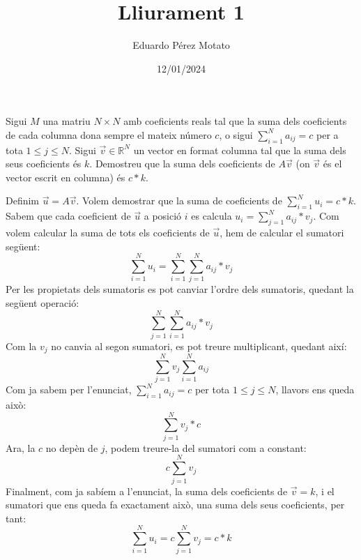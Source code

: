 \documentclass[a4paper, 12pt]{article}
\title{Lliurament 1}
\author{Eduardo Pérez Motato}
\date{12/01/2024}
\begin{document}
    \makeheader

    \begin{exercici}
        Sigui $M$ una matriu $N \times N$ amb coeficients reals tal que la suma dels coeficients de
        cada columna dona sempre el mateix número $c$, o sigui $\sum_{i=1}^{N} a_{ij}=c$ per a tota
        $1 \leq j \leq N$. Sigui $\vec{v} \in \mathbb{R}^N$ un vector en format columna tal que la
        suma dels seus coeficients és $k$. Demostreu que la suma dels coeficients de $A\vec{v}$ (on
        $\vec{v}$ és el vector escrit en columna) és $c * k$.
    \end{exercici}
    \begin{solucio}
        Definim $\vec{u} = A\vec{v}$. Volem demostrar que la suma de coeficients de $\sum_{i=1}^{N} u_i = c*k$.
        Sabem que cada coeficient de $\vec{u}$ a posició $i$ es calcula $u_i = \sum_{j=1}^{N} a_{ij}*v_j$.
        Com volem calcular la suma de tots els coeficients de $\vec{u}$, hem de calcular el sumatori
        següent:
        \begin{displaymath} 
            \sum_{i=1}^{N} u_i = \sum_{i=1}^{N} \sum_{j=1}^{N} a_{ij}*v_j  
        \end{displaymath}
        Per les propietats dels sumatoris es pot canviar l'ordre dels sumatoris, quedant la següent operació:
        \begin{displaymath}
            \sum_{j=1}^{N} \sum_{i=1}^{N} a_{ij}*v_j
        \end{displaymath}
        Com la $v_j$ no canvia al segon sumatori, es pot treure multiplicant, quedant així:
        \begin{displaymath}
            \sum_{j=1}^{N} v_j \sum_{i=1}^{N} a_{ij}
        \end{displaymath}
        Com ja sabem per l'enunciat, $\sum_{i=1}^{N} a_{ij}=c$ per tota $1 \leq j \leq N$, llavors ens queda això:
        \begin{displaymath}
            \sum_{j=1}^{N} v_j * c
        \end{displaymath}
        Ara, la $c$ no depèn de $j$, podem treure-la del sumatori com a constant:
        \begin{displaymath}
            c\sum_{j=1}^{N} v_j
        \end{displaymath}
        Finalment, com ja sabíem a l'enunciat, la suma dels coeficients de $\vec{v} = k$, i el sumatori
        que ens queda fa exactament això, una suma dels seus coeficients, per tant:
         \begin{displaymath}
            \sum_{i=1}^{N} u_i = c \sum_{j=1}^{N} v_j = c*k
        \end{displaymath}
    \end{solucio}
\end{document}
